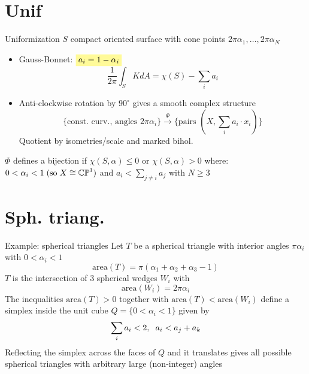 \documentclass{beamer}
\newcommand{\CP}{\mathbb{CP}}
\newcommand{\mathcolorbox}[2]{\colorbox{#1}{$\displaystyle #2$}}
\begin{document}
\section{Unif}

\begin{frame}{Uniformization}
	\(S\) compact oriented surface with cone points \(2\pi\alpha_1, \ldots, 2\pi\alpha_N\)
	\begin{itemize}
		\item Gauss-Bonnet: \(\mathcolorbox{yellow!40}{a_i = 1-\alpha_i}\)
		\[\frac{1}{2\pi}\int_S K dA = \chi(S) - \sum_i a_i \]
		\item Anti-clockwise rotation by \(90^{\circ}\) gives a smooth complex structure
		\[ \{ \text{const. curv., angles } 2\pi\alpha_i \} \xrightarrow{\Phi} \{ \text{pairs } (X, \sum_i a_i \cdot x_i) \} \]
		Quotient by isometries/scale and marked bihol. 
	\end{itemize}
	
	\begin{theorem}
		\(\Phi\) defines a bijection if \(\chi(S, \alpha) \leq 0\) or \(\chi(S, \alpha)>0\) where: \(0< \alpha_i < 1 \hspace{1mm} \mathrm{(so} \hspace{1mm} X\cong \CP^1 \mathrm{)}\) and \(a_i < \sum_{j\neq i} a_j \) with \(N \geq 3\)
	
	\end{theorem}
\end{frame}

\section{Sph. triang.}

\begin{frame}{Example: spherical triangles}
	Let \(T\) be a spherical triangle with interior angles \(\pi\alpha_i\) with \(0<\alpha_i<1\) 
	\[\mbox{area}(T) = \pi (\alpha_1+\alpha_2+\alpha_3-1)
	\]
	\(T\) is the intersection of \(3\) spherical wedges \(W_i\) with
	\[\mbox{area} (W_i) = 2\pi \alpha_i
	\]
	The inequalities \(\mbox{area}(T)>0\) together with \(\mbox{area}(T)<\mbox{area}(W_i)\) define a simplex inside the unit cube \(Q=\{0<\alpha_i<1\}\) given by
	\[\sum_i a_i < 2, \hspace{2mm} a_i < a_j + a_k
	\]
	Reflecting the simplex across the faces of \(Q\) and it translates gives all possible spherical triangles with arbitrary large (non-integer) angles
	
	
\end{frame}
\end{document}
